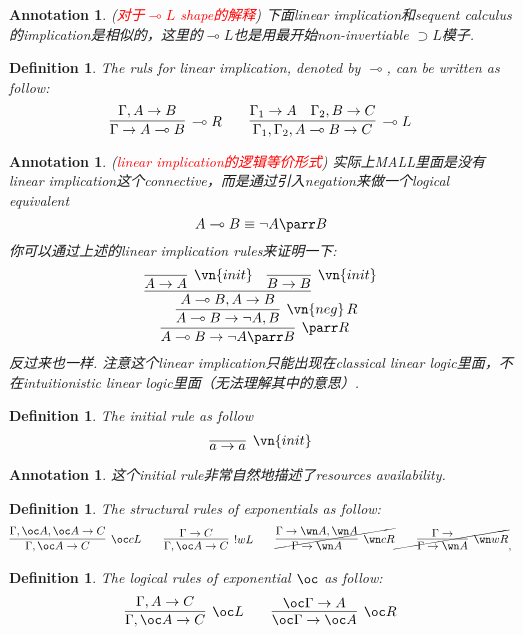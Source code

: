 \documentclass{article}
\theoremstyle{plain}
\newtheorem{definition}[theorem]{Definition}
\newtheorem{annotation}[theorem]{Annotation}
\theoremstyle{nonumberplain}
\newcommand{\redt}[1]{\textcolor{red}{#1}}
\begin{document}
\begin{annotation}
\rm (\redt{对于$\multimap L$ shape的解释}) 下面linear implication和sequent calculus的implication是相似的，这里的$\multimap L$也是用最开始non-invertiable $\supset L$模子.
\end{annotation}

\begin{definition}
\rm The ruls for linear implication, denoted by $\multimap$, can be written as follow:
\[
	\infer[\multimap R]{\Gamma \to A \multimap B}{\Gamma, A \to B}\quad\quad \infer[\multimap L]{\Gamma_1, \Gamma_2, A \multimap B \to C}{\Gamma_1 \to A & \Gamma_2, B\to C}
\]
\end{definition}

\begin{annotation}
\rm (\redt{linear implication的逻辑等价形式}) 实际上MALL里面是没有linear implication这个connective，而是通过引入negation来做一个logical equivalent
\[
	A \multimap B  \equiv \neg A \parr B
\]
你可以通过上述的linear implication rules来证明一下:
\[
	\infer[\parr R]{A \multimap B \to \neg A \parr B}{\infer[\vn{neg}~\!R]{A \multimap B \to \neg A, B}{\infer{A \multimap B, A \to B}{\infer[\vn{init}]{A \to A}{} & \infer[\vn{init}]{B \to B}{}}}}
\]
反过来也一样. 注意这个linear implication只能出现在classical linear logic里面，不在intuitionistic linear logic里面（无法理解其中的意思）.
\end{annotation}

\begin{definition}
\rm The initial rule as follow
\[
\infer[\vn{init}]{a \to a}{}
\]
\end{definition}


\begin{annotation}
\rm 这个initial rule非常自然地描述了resources availability.
\end{annotation}

\begin{definition}
\rm The structural rules of exponentials as follow:
\[
	\begin{gathered}
	\infer[\oc cL]{\Gamma, \oc A \to C}{\Gamma, \oc A, \oc A \to C} \quad\quad \infer[!wL]{\Gamma, \oc A \to C}{\Gamma \to C} \quad\quad \cancel{\infer[\wn cR]{\Gamma \to \wn A}{\Gamma \to \wn A, \wn A}} \cancel{\quad\quad \infer[\wn wR]{\Gamma \to \wn A}{\Gamma \to}}, 
	\end{gathered}
\]
\end{definition}

\begin{definition}
\rm The logical rules of exponential $\oc$ as follow:
\[
	\infer[\oc L]{\Gamma, \oc A \to C}{\Gamma, A \to C} \quad\quad \infer[\oc R]{\oc \Gamma \to \oc A}{\oc \Gamma \to A} 
\]
\end{definition}
\end{document}
